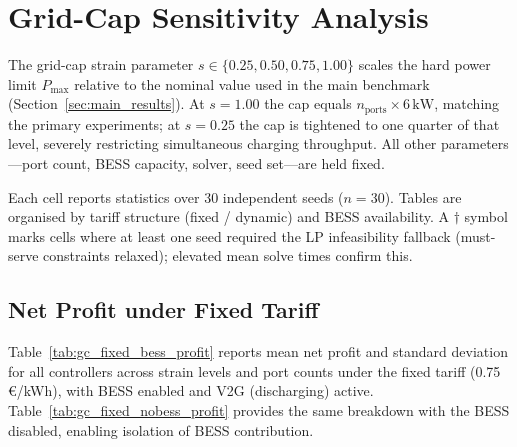 
\section{Grid-Cap Sensitivity Analysis}
\label{sec:grid_cap_results}

The grid-cap strain parameter $s \in \{0.25, 0.50, 0.75, 1.00\}$ scales the
hard power limit $P_{\max}$ relative to the nominal value used in the main
benchmark (Section~\ref{sec:main_results}).  At $s = 1.00$ the cap equals
$n_{\text{ports}} \times 6\,\text{kW}$, matching the primary experiments; at
$s = 0.25$ the cap is tightened to one quarter of that level, severely
restricting simultaneous charging throughput.  All other parameters—port
count, BESS capacity, solver, seed set—are held fixed.

Each cell reports statistics over 30 independent seeds ($n = 30$).  Tables are
organised by tariff structure (fixed / dynamic) and BESS availability.  A
$\dagger$ symbol marks cells where at least one seed required the LP
infeasibility fallback (must-serve constraints relaxed); elevated mean solve
times confirm this.

\subsection{Net Profit under Fixed Tariff}
\label{subsec:gc_fixed}

Table~\ref{tab:gc_fixed_bess_profit} reports mean net profit and standard
deviation for all controllers across strain levels and port counts under the
fixed tariff (0.75\,€/kWh), with BESS enabled and V2G (discharging) active.
Table~\ref{tab:gc_fixed_nobess_profit} provides the same breakdown with the
BESS disabled, enabling isolation of BESS contribution.

